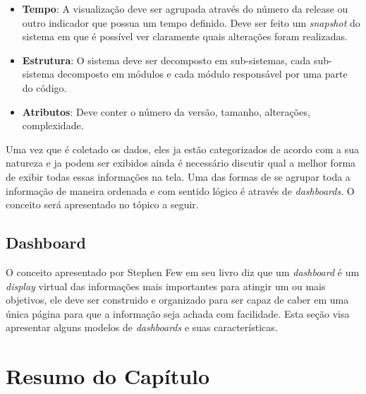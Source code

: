 \begin{itemize}
\item \textbf{Tempo}: A visualização deve ser agrupada através do número da release ou outro indicador que possua um tempo definido. Deve ser feito um \textit{snapshot} do sistema em que é possível ver claramente quais alterações foram realizadas.
\item \textbf{Estrutura}: O sistema deve ser decomposto em sub-sistemas, cada sub-sistema decomposto em módulos e cada módulo responsável por uma parte do código.
\item \textbf{Atributos}: Deve conter o número da versão, tamanho, alterações, complexidade.
\end{itemize}

Uma vez que é coletado os dados, eles ja estão categorizados de acordo com a sua natureza e ja podem ser exibidos ainda é necessário discutir qual a melhor forma de exibir todas essas informações na tela. Uma das formas de se agrupar toda a informação de maneira ordenada e com sentido lógico é através de \textit{dashboards}. O conceito será apresentado no tópico a seguir.

\subsection{Dashboard}
O conceito apresentado por Stephen Few em seu livro \cite{book_design} diz que um \textit{dashboard} é um \textit{display} virtual das informações mais importantes para atingir um ou mais objetivos, ele deve ser construido e organizado para ser capaz de caber em uma única página para que a informação seja achada com facilidade. Esta seção visa apresentar alguns modelos de \textit{dashboards} e suas características.



	\section{Resumo do Capítulo}